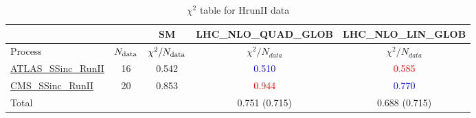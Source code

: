 \documentclass{article}
\begin{document}
\begin{table}[H]
\centering
\begin{tabular}{|l|c|c|c|c|}
\hline
 \multicolumn{2}{|c|}{} & SM& LHC_NLO_QUAD_GLOB& LHC_NLO_LIN_GLOB\\ \hline
Process & $N_{\rm data}$ & $\chi^ 2/N_{\rm data}$& $\chi^ 2/N_{data}$& $\chi^ 2/N_{data}$\\ \hline
\href{https://arxiv.org}{ATLAS_SSinc_RunII} & 16 & 0.542 & \textcolor{blue}                            {0.510} & \textcolor{red}                            {0.585} \\ \hline
\href{https://arxiv.org}{CMS_SSinc_RunII} & 20 & 0.853 & \textcolor{red}                            {0.944} & \textcolor{blue}                            {0.770} \\ \hline
\hline Total & &  & 0.751 (0.715) & 0.688 (0.715) \\ \hline
\end{tabular}
\caption{$\chi^2$ table for HrunII data}
\end{table}
\end{document}
